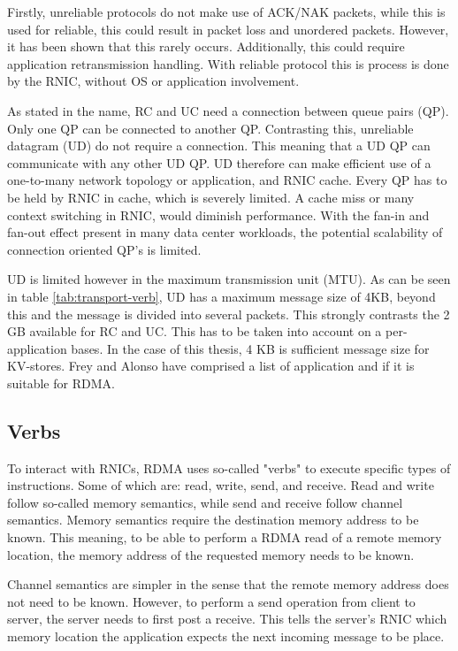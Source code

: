 Firstly, unreliable protocols do not make use of ACK/NAK packets, while this is used for reliable, this could result in packet loss and unordered packets.
However, it has been shown that this rarely occurs\cite{kalia2014using, kalia2016fasst}.
Additionally, this could require application retransmission handling.
With reliable protocol this is process is done by the RNIC, without OS or application involvement.

As stated in the name, RC and UC need a connection between queue pairs (QP).
Only one QP can be connected to another QP.
Contrasting this, unreliable datagram (UD) do not require a connection.
This meaning that a UD QP can communicate with any other UD QP.
UD therefore can make efficient use of a one-to-many network topology or application, and RNIC cache.
Every QP has to be held by RNIC in cache, which is severely limited\cite{qiu2018toward}.
A cache miss or many context switching in RNIC, would diminish performance.
With the fan-in and fan-out effect present in many data center workloads\cite{vasudevan2009safe}, the potential scalability of connection oriented QP's is limited\cite{kalia2016fasst}.

UD is limited however in the maximum transmission unit (MTU).
As can be seen in table \ref{tab:transport-verb}, UD has a maximum message size of 4KB, beyond this and the message is divided into several packets.
This strongly contrasts the 2 GB available for RC and UC.
This has to be taken into account on a per-application bases.
In the case of this thesis, 4 KB is sufficient message size for KV-stores.
Frey and Alonso have comprised a list of application and if it is suitable for RDMA\cite{frey2009minimizing}.

\subsection{Verbs}\label{subsec:verbs}
To interact with RNICs, RDMA uses so-called "verbs" to execute specific types of instructions.
Some of which are: read, write, send, and receive.
Read and write follow so-called memory semantics, while send and receive follow channel semantics.
Memory semantics require the destination memory address to be known.
This meaning, to be able to perform a RDMA read of a remote memory location, the memory address of the requested memory needs to be known.

Channel semantics are simpler in the sense that the remote memory address does not need to be known.
However, to perform a send operation from client to server, the server needs to first post a receive.
This tells the server's RNIC which memory location the application expects the next incoming message to be place.

